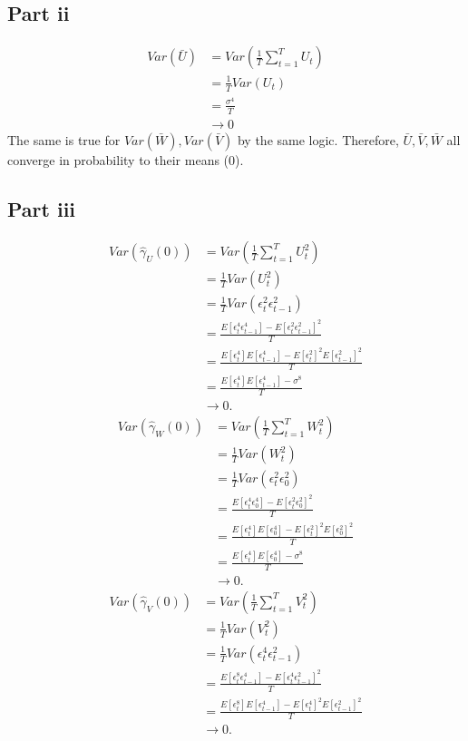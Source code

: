 \documentclass[11pt]{article} %
\begin{document}
\subsection{Part ii}
\begin{align*}
Var(\bar{U}) &= Var\left(\frac{1}{T}\sum_{t=1}^{T}U_t\right) \\
&= \frac{1}{T}Var(U_t)\\
&= \frac{\sigma^4}{T} \\
&\rightarrow  0
\end{align*}
The same is true for $Var(\bar{W}),Var(\bar{V})$ by the same logic. Therefore, $\bar{U},\bar{V},\bar{W}$ all converge in probability to their means (0).
\subsection{Part iii}
\begin{align*}
Var(\hat{\gamma}_{U}(0)) &= Var(\frac{1}{T}\sum_{t=1}^{T}U_t^2) \\
&= \frac{1}{T}Var(U_t^2)\\
&= \frac{1}{T}Var(\epsilon_t^2\epsilon_{t-1}^2)\\
&= \frac{E[\epsilon_t^4\epsilon_{t-1}^4] - E[\epsilon_t^2\epsilon_{t-1}^2]^2}{T}\\
&=  \frac{E[\epsilon_t^4]E[\epsilon_{t-1}^4] - E[\epsilon_t^2]^2E[\epsilon_{t-1}^2]^2}{T} \\
&=  \frac{E[\epsilon_t^4]E[\epsilon_{t-1}^4] - \sigma^8}{T}\\
&\rightarrow 0. 
\end{align*}
\begin{align*}
Var(\hat{\gamma}_{W}(0)) &= Var(\frac{1}{T}\sum_{t=1}^{T}W_t^2) \\
&= \frac{1}{T}Var(W_t^2)\\
&= \frac{1}{T}Var(\epsilon_t^2\epsilon_{0}^2)\\
&= \frac{E[\epsilon_t^4\epsilon_{0}^4] - E[\epsilon_t^2\epsilon_{0}^2]^2}{T}\\
&=  \frac{E[\epsilon_t^4]E[\epsilon_{0}^4] - E[\epsilon_t^2]^2E[\epsilon_{0}^2]^2}{T} \\
&=  \frac{E[\epsilon_t^4]E[\epsilon_{0}^4] - \sigma^8}{T}\\
&\rightarrow 0. 
\end{align*}
\begin{align*}
Var(\hat{\gamma}_{V}(0)) &= Var(\frac{1}{T}\sum_{t=1}^{T}V_t^2) \\
&= \frac{1}{T}Var(V_t^2)\\
&= \frac{1}{T}Var(\epsilon_t^4\epsilon_{t-1}^2)\\
&= \frac{E[\epsilon_t^8\epsilon_{t-1}^4] - E[\epsilon_t^4\epsilon_{t-1}^2]^2}{T}\\
&=  \frac{E[\epsilon_t^8]E[\epsilon_{t-1}^4] - E[\epsilon_t^4]^2E[\epsilon_{t-1}^2]^2}{T} \\
&\rightarrow 0. 
\end{align*}
\end{document}
